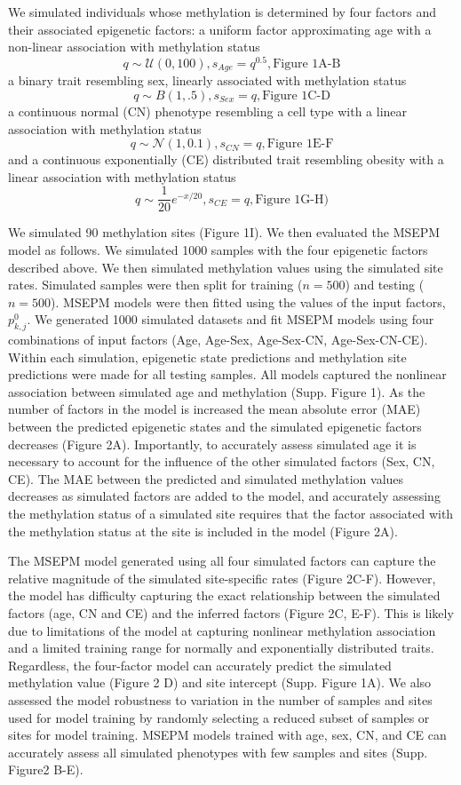 \documentclass{article}
\begin{document}
{\begin{linenumbers}
We simulated individuals whose methylation is determined by four factors and their associated epigenetic factors: 
a uniform factor approximating age with a non-linear association with methylation status 
$$q \sim\mathcal{U}(0,100), s_{Age}=q^{0.5}, \text{Figure 1A-B}$$ a binary trait resembling sex, linearly associated 
with methylation status $$q \sim B(1,.5), s_{Sex}=q, \text{Figure 1C-D}$$ a continuous normal (CN) phenotype 
resembling a cell type with a linear association with methylation status $$q \sim\mathcal{N}(1, 0.1), s_{CN}=q, 
\text{Figure 1E-F}$$ and a 
continuous exponentially (CE) distributed trait resembling obesity with a linear association with methylation status 
$$q \sim \frac{1}{20}e^{-x/20}, s_{CE}=q, \text{Figure 1G-H})$$ 


We simulated 90 methylation sites (Figure 1I). We then evaluated the MSEPM model as follows. We simulated 1000 samples with the 
four epigenetic factors described above. We then simulated methylation values using the simulated site rates. Simulated samples
 were then split for training ($n=500$) and testing ($n=500$). MSEPM models were then fitted using the values of the input factors, $p^0_{k,j}$. 
 We generated 1000 simulated datasets and fit MSEPM models using four combinations of input factors (Age, Age-Sex, Age-Sex-CN, Age-Sex-CN-CE). 
 Within each simulation, epigenetic state predictions and methylation site predictions were made for all testing samples. All models captured 
 the nonlinear association between simulated age and methylation (Supp. Figure 1). As the number of factors in the model is increased the mean 
 absolute error (MAE) between the predicted epigenetic states and the simulated epigenetic factors decreases (Figure 2A). Importantly, to accurately
  assess simulated age it is necessary to account for the influence of the other simulated factors (Sex, CN, CE). The MAE between the predicted 
  and simulated methylation values decreases as simulated factors are added to the model, and accurately assessing the methylation status of a 
  simulated site requires that the factor associated with the methylation status at the site is included in the model (Figure 2A). 

The MSEPM model generated using all four simulated factors can capture the relative magnitude of the simulated site-specific rates (Figure 2C-F).  
However, the model has difficulty capturing the exact relationship between the simulated factors (age, CN and CE) and the inferred 
factors (Figure 2C, E-F). This is likely due to limitations of the model at capturing nonlinear methylation association and a 
limited training range for normally and exponentially distributed traits. Regardless, the four-factor model can accurately 
predict the simulated methylation value (Figure 2 D) and site intercept (Supp. Figure 1A). We also assessed the model 
robustness to variation in the number of samples and sites used for model training by randomly selecting a reduced 
subset of samples or sites for model training. MSEPM models trained with age, sex, CN, and CE can accurately assess 
all simulated phenotypes with few samples and sites (Supp. Figure2 B-E). 


\end{linenumbers}}
\end{document}
